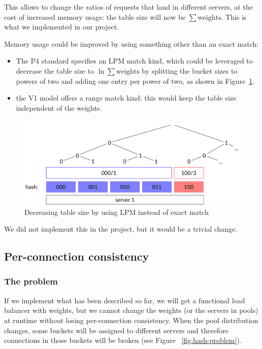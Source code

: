 \documentclass[11pt,oneside,a4paper]{article}
\begin{document}
This allows to change the ratios of requests that land in different servers, at
the cost of increased memory usage: the table size will now be
$\sum \mathrm{weights}$.
This is what we implemented in our project.

Memory usage could be improved by using something other than an exact match:

\begin{itemize}
\item The P4 standard specifies an LPM match kind, which could be leveraged to
    decrease the table size to $\ln \sum \textrm{weights}$ by splitting the
    bucket sizes to powers of two and adding one entry per power of two, as
    shown in Figure~\ref{fig:prefix-tree}.
\item the V1 model offers a range match kind: this would keep the table size
    independent of the weights.
\end{itemize}

\begin{figure}[ht]
\centering
\includegraphics[width=.8\textwidth]{figures/prefix-tree.pdf}
\caption{Decreasing table size by using LPM instead of exact match}
\label{fig:prefix-tree}
\end{figure}

We did not implement this in the project, but it would be a trivial change.

\subsection{Per-connection consistency}
\subsubsection{The problem}

If we implement what has been described so far, we will get a functional load
balancer with weights, but we cannot change the weights (or the servers in
pools) at runtime without losing per-connection consistency.
When the pool distribution changes, some buckets will be assigned to different
servers and therefore connections in those buckets will be broken (see Figure
~\ref{fig:hash-problem}).
\end{document}
